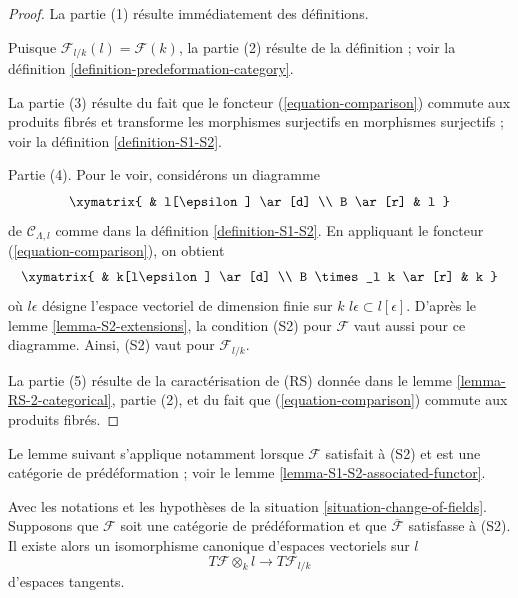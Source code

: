 \begin{proof}
La partie (1) résulte immédiatement des définitions.

\medskip\noindent
Puisque $\mathcal{F}_{l/k}(l) = \mathcal{F}(k)$, la partie (2) résulte de la
définition ; voir la définition \ref{definition-predeformation-category}.

\medskip\noindent
La partie (3) résulte du fait que le foncteur (\ref{equation-comparison})
commute aux produits fibrés et transforme les morphismes surjectifs en
morphismes surjectifs ; voir la définition \ref{definition-S1-S2}.

\medskip\noindent
Partie (4). Pour le voir, considérons un diagramme
$$
\xymatrix{
          & l[\epsilon] \ar[d] \\
B  \ar[r] & l
}
$$
de $\mathcal{C}_{\Lambda, l}$ comme dans la définition
\ref{definition-S1-S2}. En appliquant le foncteur
(\ref{equation-comparison}), on obtient
$$
\xymatrix{
          & k[l\epsilon] \ar[d] \\
B \times_l k  \ar[r] & k
}
$$
où $l\epsilon$ désigne l'espace vectoriel de dimension finie sur $k$
$l\epsilon \subset l[\epsilon]$. D'après le lemme
\ref{lemma-S2-extensions}, la condition (S2) pour $\mathcal{F}$ vaut aussi pour
ce diagramme. Ainsi, (S2) vaut pour $\mathcal{F}_{l/k}$.

\medskip\noindent
La partie (5) résulte de la caractérisation de (RS) donnée dans le lemme
\ref{lemma-RS-2-categorical}, partie (2), et du fait que
(\ref{equation-comparison}) commute aux produits fibrés.
\end{proof}

\noindent
Le lemme suivant s'applique notamment lorsque $\mathcal{F}$ satisfait à (S2)
et est une catégorie de prédéformation ; voir le lemme
\ref{lemma-S1-S2-associated-functor}.

\begin{lemma}
\label{lemma-tangent-space-change-of-field}
Avec les notations et les hypothèses de la situation
\ref{situation-change-of-fields}. Supposons que $\mathcal{F}$ soit une
catégorie de prédéformation et que $\overline{\mathcal{F}}$ satisfasse à (S2).
Il existe alors un isomorphisme canonique d'espaces vectoriels sur $l$
$$
T\mathcal{F} \otimes_k l \longrightarrow T\mathcal{F}_{l/k}
$$
d'espaces tangents.
\end{lemma}

